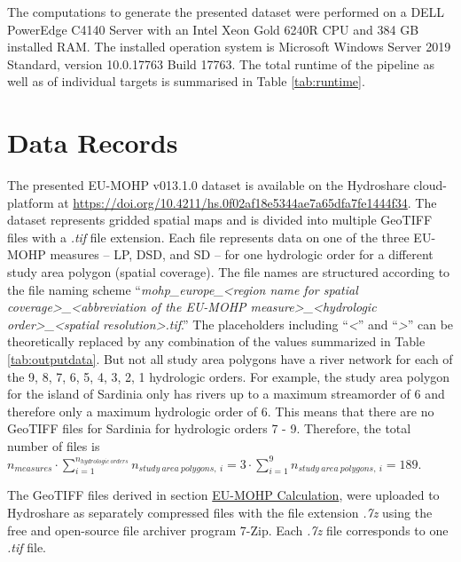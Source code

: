 \documentclass[fleqn,10pt]{wlscirep}
\begin{document}
The computations to generate the presented dataset were performed on a DELL PowerEdge C4140 Server with an Intel Xeon Gold 6240R CPU and 384 GB installed RAM. The installed operation system is Microsoft Windows Server 2019 Standard, version 10.0.17763 Build 17763. The total runtime of the pipeline as well as of individual targets is summarised in Table \ref{tab:runtime}.

\hypertarget{data-records}{%
\section*{Data Records}\label{data-records}}

The presented EU-MOHP v013.1.0 dataset\cite{nolscher_eu-mohp_2021-1} is available on the Hydroshare cloud-platform at \url{https://doi.org/10.4211/hs.0f02af18e5344ae7a65dfa7fe1444f34}. The dataset represents gridded spatial maps and is divided into multiple GeoTIFF files with a \emph{.tif} file extension. Each file represents data on one of the three EU-MOHP\cite{nolscher_eu-mohp_2021-1} measures -- LP, DSD, and SD -- for one hydrologic order for a different study area polygon (spatial coverage). The file names are structured according to the file naming scheme ``\emph{mohp\_europe\_\textless region name for spatial coverage\textgreater\_\textless abbreviation of the EU-MOHP measure\textgreater\_\textless hydrologic order\textgreater\_\textless spatial resolution\textgreater.tif}.'' The placeholders including ``\emph{\textless{}}'' and ``\emph{\textgreater{}}'' can be theoretically replaced by any combination of the values summarized in Table \ref{tab:outputdata}. But not all study area polygons have a river network for each of the 9, 8, 7, 6, 5, 4, 3, 2, 1 hydrologic orders. For example, the study area polygon for the island of Sardinia only has rivers up to a maximum streamorder of 6 and therefore only a maximum hydrologic order of 6. This means that there are no GeoTIFF files for Sardinia for hydrologic orders 7 - 9. Therefore, the total number of files is \(n_{measures}\cdot \sum_{i = 1}^{n_{hydrologic\: orders}} n_{study\: area\: polygons,\: i} = 3\cdot \sum_{i = 1}^{9} n_{study\: area\: polygons,\: i} = 189\).

The GeoTIFF files derived in section \protect\hyperlink{eu-mohp-calculation}{EU-MOHP Calculation}, were uploaded to Hydroshare as separately compressed files with the file extension \emph{.7z} using the free and open-source file archiver program 7-Zip. Each \emph{.7z} file corresponds to one \emph{.tif} file.
\end{document}
